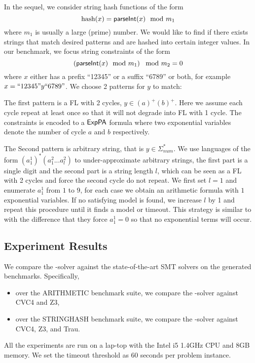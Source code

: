 {%

In the sequel, we consider string hash functions of the form  
\begin{equation}
    \text{hash}(x)= \textsf{parseInt}(x) \mod m_1  \notag
\end{equation}
where $m_1$ is usually a large (prime) number. We would like to find if there exists strings that match desired patterns and are hashed into certain integer values. In our benchmark, we focus string constraints of the form
\begin{equation}
    \left( \textsf{parseInt}(x) \mod m_1\right) \mod m_2 = 0   \notag
\end{equation}
where $x$ either has a prefix ``12345'' or a suffix ``6789'' or both, for example $x=``12345"y``6789"$. We choose 2 patterns for $y$ to match: 

The first pattern is a FL with 2 cycles, $y \in (a)^+(b)^+$. Here we assume each cycle repeat at least once so that it will not degrade into FL with 1 cycle. The constraints is encoded to a ${\sf ExpPA}$ formula where two exponential variables denote the number of cycle $a$ and $b$ respectively.

The Second pattern is arbitrary string, that is $y\in \Sigma_{num}^*$. We use languages of the form $(a^1_1)^* (a^2_1...a^2_l)$ to under-approximate arbitrary strings, the first part is a single digit and the second part is a string length $l$, which can be seen as a FL with 2 cycles and force the second cycle do not repeat. We first set $l=1$ and enumerate $a^1_1$ from $1$ to $9$, for each case we obtain an arithmetic formula with $1$ exponential variables. If no satisfying model is found, we increase $l$ by 1 and repeat this procedure until it finds a model or timeout. This strategy is similar to \cite{Abdulla2020} with the difference that they force $a^1_1=0$ so that no exponential terms will occur.
}

\subsection{Experiment Results}

We compare the {\paexp}-solver against the state-of-the-art SMT solvers on the generated benchmarks. Specifically, 
\begin{itemize}
\item over the ARITHMETIC benchmark suite, we compare the {\paexp}-solver against CVC4 and Z3,
\item over the STRINGHASH benchmark suite, we compare the {\paexp}-solver against CVC4, Z3, and Trau. 
\end{itemize}
All the experiments are run on a lap-top with the Intel i5 1.4GHz CPU and 8GB memory. We set the timeout threshold as 60 seconds per problem instance. 

